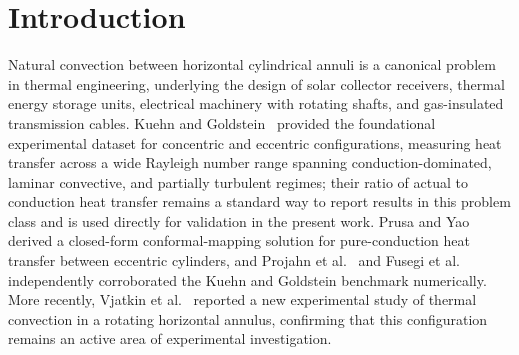 \section{Introduction}
\label{sec:intro}

Natural convection between horizontal cylindrical annuli is a canonical problem in thermal engineering, underlying the design of solar collector receivers, thermal energy storage units, electrical machinery with rotating shafts, and gas-insulated transmission cables. Kuehn and Goldstein~\cite{KuehnGoldstein1978} provided the foundational experimental dataset for concentric and eccentric configurations, measuring heat transfer across a wide Rayleigh number range spanning conduction-dominated, laminar convective, and partially turbulent regimes; their ratio of actual to conduction heat transfer remains a standard way to report results in this problem class and is used directly for validation in the present work. Prusa and Yao~\cite{PrusaYao1983} derived a closed-form conformal-mapping solution for pure-conduction heat transfer between eccentric cylinders, and Projahn et al.~\cite{Projahn1981} and Fusegi et al.~\cite{Fusegi1986} independently corroborated the Kuehn and Goldstein benchmark numerically. More recently, Vjatkin et al.~\cite{Vjatkin2024} reported a new experimental study of thermal convection in a rotating horizontal annulus, confirming that this configuration remains an active area of experimental investigation.

